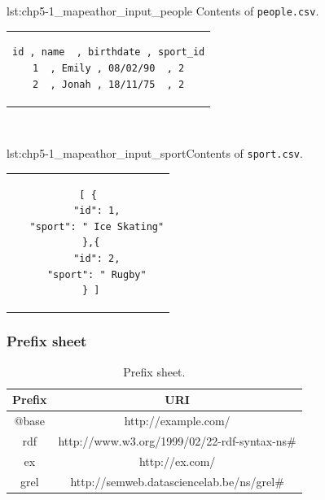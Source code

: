 \begin{minipage}{0.48\linewidth}
\begin{captionedlisting}{lst:chp5-1_mapeathor_input_people}{ Contents of \texttt{people.csv}.}
\centering
\begin{tabular}{c}
{
\begin{lstlisting}[basicstyle=\ttfamily\small,label={list:example1},columns=flexible]
id , name  , birthdate , sport_id
1  , Emily , 08/02/90  , 2
2  , Jonah , 18/11/75  , 2
\end{lstlisting}
}
\end{tabular}
\end{captionedlisting}
\end{minipage}
\,\,\,\,\hfill
\begin{minipage}{0.52\linewidth}
\begin{captionedlisting}{lst:chp5-1_mapeathor_input_sport}{Contents of \texttt{sport.csv}.}
\centering
\begin{tabular}{c}
\hspace{1.5em}
{
\begin{lstlisting}[basicstyle=\ttfamily\small,label={list:example1},columns=flexible]
[ {
   "id": 1,
   "sport": " Ice Skating"
 },{
   "id": 2,
   "sport": " Rugby"
 } ]
\end{lstlisting}
}
\end{tabular}
\end{captionedlisting}
\end{minipage}

\subsubsection{Prefix sheet} 

\begin{table}[h!]
\caption{Prefix sheet.}
\label{tab:chp5-1_prefix_sheet}
\centering
\begin{tabular}{c|c}
\midrule
\textbf{Prefix} & \textbf{URI}                                 \\ \midrule
@base           & http://example.com/                          \\
rdf             & http://www.w3.org/1999/02/22-rdf-syntax-ns\# \\
ex              & http://ex.com/                               \\ 
grel            & http://semweb.datasciencelab.be/ns/grel\#     \\
\midrule
\end{tabular}
\end{table}

